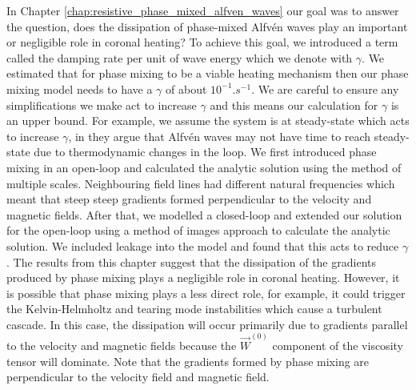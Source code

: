 In Chapter \ref{chap:resistive_phase_mixed_alfven_waves} our goal was to answer the question, does the dissipation of phase-mixed Alfv\'en waves play an important or negligible role in coronal heating? To achieve this goal, we introduced a term called the damping rate per unit of wave energy which we denote with $\gamma$. We estimated that for phase mixing to be a viable heating mechanism then our phase mixing model needs to have a $\gamma$ of about $10^{-1}\si{.s^{-1}}$. We are careful to ensure any simplifications we make act to increase $\gamma$ and this means our calculation for $\gamma$ is an upper bound. For example, we assume the system is at steady-state which acts to increase $\gamma$, in \citet{Arregui2015} they argue that Alfv\'en waves may not have time to reach steady-state due to thermodynamic changes in the loop. We first introduced phase mixing in an open-loop and calculated the analytic solution using the method of multiple scales. Neighbouring field lines had different natural frequencies which meant that steep steep gradients formed perpendicular to the velocity and magnetic fields. After that, we modelled a closed-loop and extended our solution for the open-loop using a method of images approach to calculate the analytic solution. We included leakage into the model and found that this acts to reduce $\gamma$. The results from this chapter suggest that the dissipation of the gradients produced by phase mixing plays a negligible role in coronal heating. However, it is possible that phase mixing plays a less direct role, for example, it could trigger the Kelvin-Helmholtz and tearing mode instabilities which cause a turbulent cascade. In this case, the dissipation will occur primarily due to gradients parallel to the velocity and magnetic fields because the $\vec{W}^{(0)}$ component of the viscosity tensor will dominate. Note that the gradients formed by phase mixing are perpendicular to the velocity field and magnetic field.

